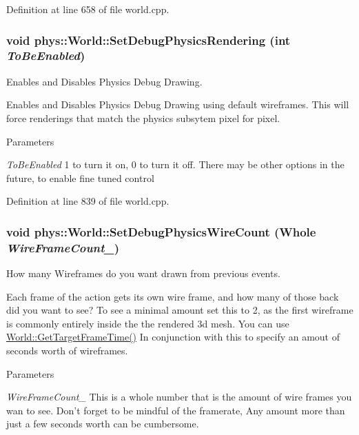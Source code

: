 Definition at line 658 of file world.cpp.

\hypertarget{classphys_1_1World_a9fbd112d2677aa948301287d541b64bb}{
\subsubsection[{SetDebugPhysicsRendering}]{\setlength{\rightskip}{0pt plus 5cm}void phys::World::SetDebugPhysicsRendering (int {\em ToBeEnabled})}}
\label{da/ddf/classphys_1_1World_a9fbd112d2677aa948301287d541b64bb}


Enables and Disables Physics Debug Drawing. 

Enables and Disables Physics Debug Drawing using default wireframes. This will force renderings that match the physics subsytem pixel for pixel. 
\begin{DoxyParams}{Parameters}
\item[{\em ToBeEnabled}]1 to turn it on, 0 to turn it off. There may be other options in the future, to enable fine tuned control \end{DoxyParams}


Definition at line 839 of file world.cpp.

\hypertarget{classphys_1_1World_a6fa4d1e58a78ba0403af1c003fd321d9}{
\subsubsection[{SetDebugPhysicsWireCount}]{\setlength{\rightskip}{0pt plus 5cm}void phys::World::SetDebugPhysicsWireCount ({\bf Whole} {\em WireFrameCount\_\-})}}
\label{da/ddf/classphys_1_1World_a6fa4d1e58a78ba0403af1c003fd321d9}


How many Wireframes do you want drawn from previous events. 

Each frame of the action gets its own wire frame, and how many of those back did you want to see? To see a minimal amount set this to 2, as the first wireframe is commonly entirely inside the the rendered 3d mesh. You can use \hyperlink{classphys_1_1World_aa063ace52be484c7b03ec5859453f48b}{World::GetTargetFrameTime()} In conjunction with this to specify an amout of seconds worth of wireframes. 
\begin{DoxyParams}{Parameters}
\item[{\em WireFrameCount\_\-}]This is a whole number that is the amount of wire frames you wan to see. Don't forget to be mindful of the framerate, Any amount more than just a few seconds worth can be cumbersome. \end{DoxyParams}


